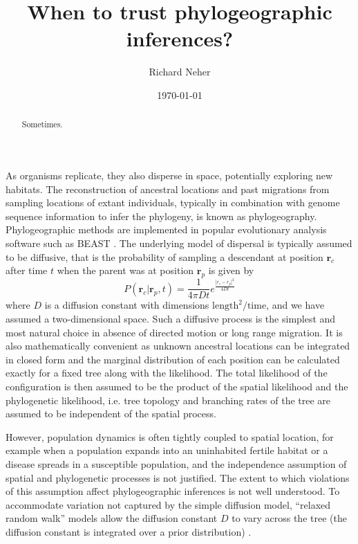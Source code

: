 \documentclass[aps,rmp, twocolumn]{revtex4}
\newcommand{\rvec}{\mathbf{r}}
\begin{document}
\title{When to trust phylogeographic inferences?}
\author{Richard Neher}
\date{\today}
\begin{abstract}
    Sometimes.
\end{abstract}

\maketitle
As organisms replicate, they also disperse in space, potentially exploring new habitats.
The reconstruction of ancestral locations and past migrations from sampling locations of extant individuals, typically in combination with genome sequence information to infer the phylogeny, is known as phylogeography.
Phylogeographic methods are implemented in popular evolutionary analysis software such as BEAST \citep{pybus_unifying_2012}.
The underlying model of dispersal is typically assumed to be diffusive, that is the probability of sampling a descendant at position $\rvec_c$ after time $t$ when the parent was at position $\rvec_p$ is given by
\begin{equation}
    P(\rvec_c| \rvec_p, t) = \frac{1}{4\pi D t}e^{\frac{|r_c - r_p|^2}{4Dt}}
\end{equation}
where $D$ is a diffusion constant with dimensions $\mathrm{length}^2/\mathrm{time}$, and we have assumed a two-dimensional space.
Such a diffusive process is the simplest and most natural choice in absence of directed motion or long range migration.
It is also mathematically convenient as unknown ancestral locations can be integrated in closed form and the marginal distribution of each position can be calculated exactly for a fixed tree along with the likelihood.
The total likelihood of the configuration is then assumed to be the product of the spatial likelihood and the phylogenetic likelihood, i.e. tree topology and branching rates of the tree are assumed to be independent of the spatial process.

However, population dynamics is often tightly coupled to spatial location, for example when a population expands into an uninhabited fertile habitat or a disease spreads in a susceptible population, and the independence assumption of spatial and phylogenetic processes is not justified.
The extent to which violations of this assumption affect phylogeographic inferences is not well understood.
To accommodate variation not captured by the simple diffusion model, ``relaxed random walk'' models allow the diffusion constant $D$ to vary across the tree (the diffusion constant is integrated over a prior distribution) \citep{dellicour_relax_2021}.
\end{document}
